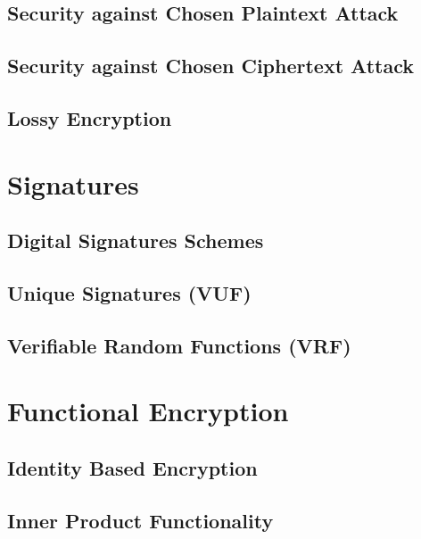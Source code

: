 	\section{Security against Chosen Plaintext Attack}
	
	

	\section{Security against Chosen Ciphertext Attack}
	
	
	\section{Lossy Encryption}
	

\chapter{Signatures}
	\section{Digital Signatures Schemes}
	
	
	
	\section{Unique Signatures (VUF)}
	
	\section{Verifiable Random Functions (VRF)}
	
	
	
\chapter{Functional Encryption}
	\section{Identity Based Encryption}
	
	
	
	\section{Inner Product Functionality}
	
	
	
	
